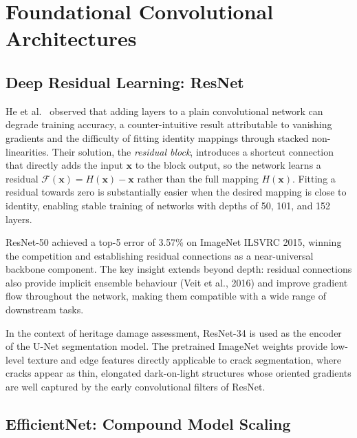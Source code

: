 \documentclass[12pt,a4paper]{article}
\begin{document}
\section{Foundational Convolutional Architectures}
\label{sec:backbones}

\subsection{Deep Residual Learning: ResNet}

He et al.~\cite{he2016deep} observed that adding layers to a plain convolutional network can degrade training accuracy, a counter-intuitive result attributable to vanishing gradients and the difficulty of fitting identity mappings through stacked non-linearities. Their solution, the \textit{residual block}, introduces a shortcut connection that directly adds the input $\mathbf{x}$ to the block output, so the network learns a residual $\mathcal{F}(\mathbf{x}) = H(\mathbf{x}) - \mathbf{x}$ rather than the full mapping $H(\mathbf{x})$. Fitting a residual towards zero is substantially easier when the desired mapping is close to identity, enabling stable training of networks with depths of 50, 101, and 152 layers.

ResNet-50 achieved a top-5 error of 3.57\% on ImageNet ILSVRC 2015, winning the competition and establishing residual connections as a near-universal backbone component. The key insight extends beyond depth: residual connections also provide implicit ensemble behaviour (Veit et al., 2016) and improve gradient flow throughout the network, making them compatible with a wide range of downstream tasks.

In the context of heritage damage assessment, ResNet-34 is used as the encoder of the U-Net segmentation model. The pretrained ImageNet weights provide low-level texture and edge features directly applicable to crack segmentation, where cracks appear as thin, elongated dark-on-light structures whose oriented gradients are well captured by the early convolutional filters of ResNet.

\subsection{EfficientNet: Compound Model Scaling}
\end{document}
